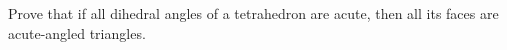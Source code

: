 Prove that if all dihedral angles of a tetrahedron are acute, then all its faces are acute-angled triangles.